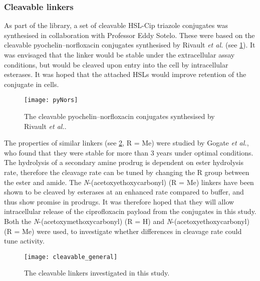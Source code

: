 \subsubsection{Cleavable linkers\label{sec:cleavable_intro}}

As part of the library, a set of cleavable HSL-Cip triazole conjugates was synthesised in collaboration with Professor Eddy Sotelo.
These were based on the cleavable pyochelin–norfloxacin conjugates synthesised by Rivault \textit{et al.}\cite{Rivault2007} (see \ref{fgr:pyNors}).
It was envisaged that the linker would be stable under the extracellular assay conditions, but would be cleaved upon entry into the cell by intracellular esterases. It was hoped that the attached HSLs would improve retention of the conjugate in cells. 

\begin{figure}[H]
	\begin{center}
		\texttt{[image: pyNors]}
		\caption{The cleavable pyochelin–norfloxacin conjugates synthesised by Rivault \textit{et al.}\cite{Rivault2007}. \label{fgr:pyNors}}
	\end{center}
\end{figure}

The properties of similar linkers (see \ref{fgr:cleavable_general}, R = Me) were studied by Gogate \textit{et al.}, who found that they were stable for more than 3 years under optimal conditions\cite{Gogate1987}. 
The hydrolysis of a secondary amine prodrug is dependent on ester hydrolysis rate, therefore the cleavage rate can be tuned by changing the R group between the ester and amide\cite{Ortmann2005}. 
The \textit{N}-(acetoxyethoxycarbonyl) (R = Me) linkers have been shown to be cleaved by esterases at an enhanced rate compared to buffer, and thus show promise in prodrugs\cite{Gogate1987a}. It was therefore hoped that they will allow intracellular release of the ciprofloxacin  payload from the conjugates in this study. Both the \textit{N}-(acetoxymethoxycarbonyl) (R = H) and \textit{N}-(acetoxyethoxycarbonyl) (R = Me) were used, to investigate whether differences in cleavage rate could tune activity.

\begin{figure}[H]
	\begin{center}
		\texttt{[image: cleavable\_general]}
		\caption{The cleavable linkers investigated in this study. \label{fgr:cleavable_general}}
	\end{center}
\end{figure}

